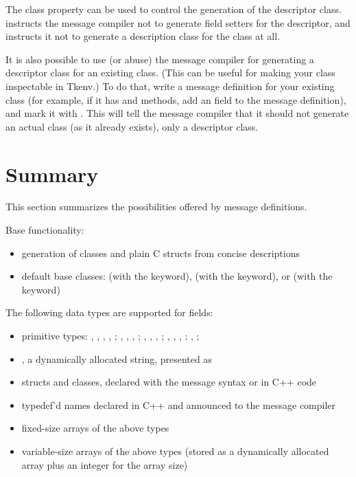The  class property can be used to control the generation
of the descriptor class.  instructs the message
compiler not to generate field setters for the descriptor, and
 instructs it not to generate a description class
for the class at all.

It is also possible to use (or abuse) the message compiler for generating a
descriptor class for an existing class. (This can be useful for making your
class inspectable in Tkenv.) To do that, write a message definition for
your existing class (for example, if it has  and
 methods, add an  field to the message
definition), and mark it with . This will tell the
message compiler that it should not generate an actual class (as it already
exists), only a descriptor class.



\section{Summary}
\label{sec:ch-msg-defs:summary}

This section summarizes the possibilities offered by message definitions.

Base functionality:

\begin{itemize}
  \item  generation of classes and plain C structs from concise descriptions
  \item  default base classes:
     (with the  keyword),
     (with the  keyword), or
     (with the  keyword)
\end{itemize}

The following data types are supported for fields:

\begin{itemize}
  \item  primitive types:
    , , , , ;
    , , , ;
    , , , ;
    , , , ;
    , ; 
  \item  {}, a dynamically allocated string, presented as 
  \item  structs and classes, declared with the message syntax or in C++ code
  \item  typedef'd names declared in C++ and announced to the message compiler
  \item  fixed-size arrays of the above types
  \item  variable-size arrays of the above types (stored as a dynamically
    allocated array plus an integer for the array size)
\end{itemize}

